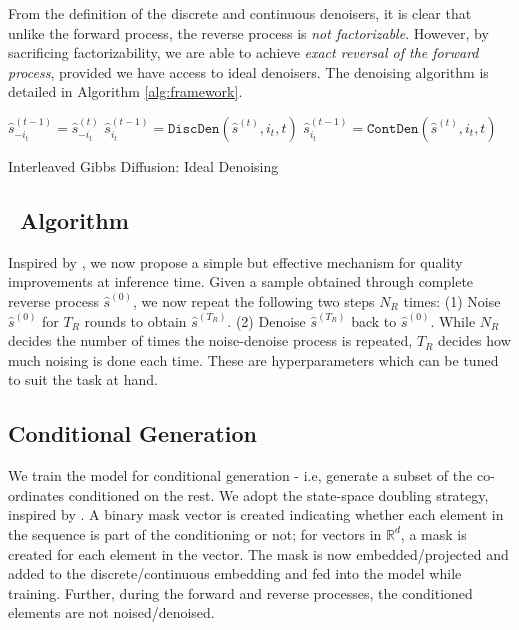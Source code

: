 From the definition of the discrete and continuous denoisers, it is clear that unlike the forward process, the reverse process is \textit{not factorizable}. However, by sacrificing factorizability, we are able to achieve \textit{exact reversal of the forward process}, provided we have access to ideal denoisers. The denoising algorithm is detailed in Algorithm \ref{alg:framework}.

\begin{algorithm}[ht]
\begin{algorithmic}

 \STATE $\hat{s}^{(t-1)}_{-i_t} = \hat{s}^{(t)}_{-i_t}$
    \STATE  $\hat{s}^{(t-1)}_{i_t} = \texttt{DiscDen}(\hat{s}^{(t)},i_t,t)$
 \ELSE
    \STATE  $\hat{s}^{(t-1)}_{i_t} = \texttt{ContDen}(\hat{s}^{(t)},i_t,t)$ 
  \ENDIF
\ENDFOR
\end{algorithmic}
\caption{Interleaved Gibbs Diffusion: Ideal Denoising}
\label{alg:framework}
\end{algorithm}

\subsection{\redenoise~Algorithm}
\label{sec:redenoise}
Inspired by \cite{meng2021sdedit}, we now propose a simple but effective mechanism for quality improvements at inference time. Given a sample obtained through complete reverse process $\hat{s}^{(0)}$, we now repeat the following two steps $N_R$ times: (1) Noise $\hat{s}^{(0)}$ for $T_R$ rounds to obtain $\hat{s}^{(T_R)}$. (2) Denoise $\hat{s}^{(T_R)}$ back to $\hat{s}^{(0)}$.
While $N_R$ decides the number of times the noise-denoise process is repeated, $T_R$ decides how much noising is done each time. These are hyperparameters which can be tuned to suit the task at hand.

\subsection{Conditional Generation}
\label{sec:cond_generation}
We train the model for conditional generation - i.e, generate a subset of the co-ordinates conditioned on the rest. We adopt the state-space doubling strategy, inspired by \cite{levi2023dlt}. A binary mask vector is created indicating whether each element in the sequence is part of the conditioning or not; for vectors in $\mathbb{R}^d$, a mask is created for each element in the vector. The mask is now embedded/projected and added to the discrete/continuous embedding and fed into the model while training. Further, during the forward and reverse processes, the conditioned elements are not noised/denoised.
